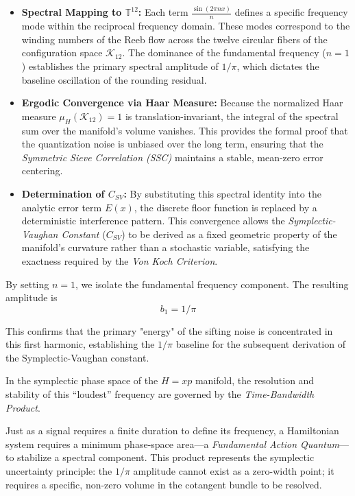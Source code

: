 \documentclass[sn-mathphys-num, pdflatex]{sn-jnl}
\begin{document}
\begin{itemize}
    \item \textbf{Spectral Mapping to $\mathbb{T}^{12}$:} Each term $\frac{\sin(2\pi nx)}{n}$ defines a specific frequency mode within the reciprocal frequency domain. These modes correspond to the winding numbers of the Reeb flow across the twelve circular fibers of the configuration space $\mathcal{K}_{12}$. The dominance of the fundamental frequency ($n=1$) establishes the primary spectral amplitude of $1/\pi$, which dictates the baseline oscillation of the rounding residual.
    
    \item \textbf{Ergodic Convergence via Haar Measure:} Because the normalized Haar measure $\mu_H(\mathcal{K}_{12})=1$ is translation-invariant, the integral of the spectral sum over the manifold's volume vanishes. This provides the formal proof that the quantization noise is unbiased over the long term, ensuring that the \textit{Symmetric Sieve Correlation (SSC)} maintains a stable, mean-zero error centering.
    
    \item \textbf{Determination of $C_{SV}$:} By substituting this spectral identity into the analytic error term $E(x)$, the discrete floor function is replaced by a deterministic interference pattern. This convergence allows the \textit{Symplectic-Vaughan Constant} ($C_{SV}$) to be derived as a fixed geometric property of the manifold's curvature rather than a stochastic variable, satisfying the exactness required by the \textit{Von Koch Criterion}.
\end{itemize}
By setting $n=1$, we isolate the fundamental frequency component. The resulting amplitude is $$b_1 = 1/\pi$$ 

This confirms that the primary "energy" of the sifting noise is concentrated in this first harmonic, establishing the $1/\pi$ baseline for the subsequent derivation of the Symplectic-Vaughan constant. 

In the symplectic phase space of the $H=xp$ manifold, the resolution and stability of this ``loudest'' frequency are governed by the \textit{Time-Bandwidth Product}. 

Just as a signal requires a finite duration to define its frequency, a Hamiltonian system requires a minimum phase-space area---a \textit{Fundamental Action Quantum}---to stabilize a spectral component. This product represents the symplectic uncertainty principle: the $1/\pi$ amplitude cannot exist as a zero-width point; it requires a specific, non-zero volume in the cotangent bundle to be resolved. 
\end{document}
